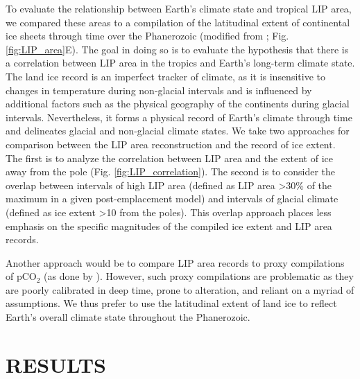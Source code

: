 \documentclass[11pt,letterpaper]{article}
\begin{document}
To evaluate the relationship between Earth's climate state and tropical LIP area, we compared these areas to a compilation of the latitudinal extent of continental ice sheets through time over the Phanerozoic (modified from \citealp{Royer2004a}; Fig. \ref{fig:LIP_area}E). The goal in doing so is to evaluate the hypothesis that there is a correlation between LIP area in the tropics and Earth's long-term climate state. The land ice record is an imperfect tracker of climate, as it is insensitive to changes in temperature during non-glacial intervals and is influenced by additional factors such as the physical geography of the continents during glacial intervals. Nevertheless, it forms a physical record of Earth's climate through time and delineates glacial and non-glacial climate states. We take two approaches for comparison between the LIP area reconstruction and the record of ice extent. The first is to analyze the correlation between LIP area and the extent of ice away from the pole (Fig. \ref{fig:LIP_correlation}). The second is to consider the overlap between intervals of high LIP area (defined as LIP area \textgreater30\% of the maximum in a given post-emplacement model) and intervals of glacial climate (defined as ice extent \textgreater10\textdegree\xspace from the poles). This overlap approach places less emphasis on the specific magnitudes of the compiled ice extent and LIP area records.

Another approach would be to compare LIP area records to proxy compilations of pCO$_2$ (as done by \citealp{Johansson2018a}). However, such proxy compilations are problematic as they are poorly calibrated in deep time, prone to alteration, and reliant on a myriad of assumptions. We thus prefer to use the latitudinal extent of land ice to reflect Earth's overall climate state throughout the Phanerozoic.

\section*{RESULTS}
\end{document}
